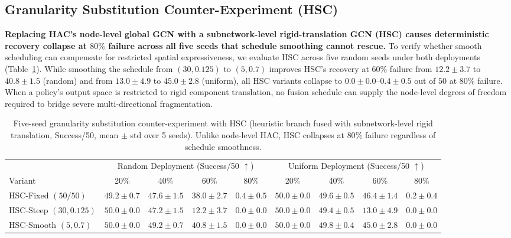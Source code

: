 \documentclass[11pt]{article}
\theoremstyle{plain}
\theoremstyle{definition}
\theoremstyle{remark}
\begin{document}
\subsection{Granularity Substitution Counter-Experiment (HSC)}
\label{sec:hsc}
\textbf{Replacing HAC's node-level global GCN with a subnetwork-level rigid-translation GCN (HSC) causes deterministic recovery collapse at $80\%$ failure across all five seeds that schedule smoothing cannot rescue.} To verify whether smooth scheduling can compensate for restricted spatial expressiveness, we evaluate HSC across five random seeds under both deployments (Table~\ref{tab:hsc}). While smoothing the schedule from $(30, 0.125)$ to $(5, 0.7)$ improves HSC's recovery at $60\%$ failure from $12.2 \pm 3.7$ to $40.8 \pm 1.5$ (random) and from $13.0 \pm 4.9$ to $45.0 \pm 2.8$ (uniform), all HSC variants collapse to $0.0 \pm 0.0$--$0.4 \pm 0.5$ out of $50$ at $80\%$ failure. When a policy's output space is restricted to rigid component translation, no fusion schedule can supply the node-level degrees of freedom required to bridge severe multi-directional fragmentation.

\begin{table}[t]
\centering
\caption{Five-seed granularity substitution counter-experiment with HSC (heuristic branch fused with subnetwork-level rigid translation, Success/50, mean $\pm$ std over 5 seeds). Unlike node-level HAC, HSC collapses at $80\%$ failure regardless of schedule smoothness.}
\label{tab:hsc}
\scriptsize
\setlength{\tabcolsep}{4.2pt}
\begin{tabular}{@{}lcccccccc@{}}
\toprule
 & \multicolumn{4}{c}{Random Deployment (Success/50 $\uparrow$)} & \multicolumn{4}{c}{Uniform Deployment (Success/50 $\uparrow$)} \\
\cmidrule(lr){2-5}\cmidrule(lr){6-9}
Variant & 20\% & 40\% & 60\% & 80\% & 20\% & 40\% & 60\% & 80\% \\
\midrule
HSC-Fixed $(50/50)$     & $49.2\pm0.7$ & $47.6\pm1.5$ & $38.0\pm2.7$ & $0.4\pm0.5$ & $50.0\pm0.0$ & $49.6\pm0.5$ & $46.4\pm1.4$ & $0.2\pm0.4$ \\
HSC-Steep $(30, 0.125)$ & $50.0\pm0.0$ & $47.2\pm1.5$ & $12.2\pm3.7$ & $0.0\pm0.0$ & $50.0\pm0.0$ & $49.4\pm0.5$ & $13.0\pm4.9$ & $0.0\pm0.0$ \\
HSC-Smooth $(5, 0.7)$   & $50.0\pm0.0$ & $49.2\pm0.7$ & $40.8\pm1.5$ & $0.0\pm0.0$ & $50.0\pm0.0$ & $49.8\pm0.4$ & $45.0\pm2.8$ & $0.0\pm0.0$ \\
\bottomrule
\end{tabular}
\end{table}
\end{document}
